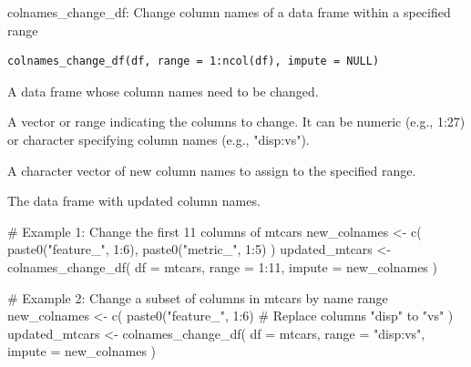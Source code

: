 \documentclass[a4paper]{book}
\begin{document}
%
\begin{Description}
colnames\_change\_df: Change column names of a data frame within a specified range
\end{Description}
%
\begin{Usage}
\begin{verbatim}
colnames_change_df(df, range = 1:ncol(df), impute = NULL)
\end{verbatim}
\end{Usage}
%
\begin{Arguments}
\begin{ldescription}
\item[\code{df}] A data frame whose column names need to be changed.

\item[\code{range}] A vector or range indicating the columns to change. It can be numeric (e.g., 1:27) or character specifying column names (e.g., "disp:vs").

\item[\code{impute}] A character vector of new column names to assign to the specified range.
\end{ldescription}
\end{Arguments}
%
\begin{Value}
The data frame with updated column names.
\end{Value}
%
\begin{Examples}
\begin{ExampleCode}
# Example 1: Change the first 11 columns of mtcars
new_colnames <- c(
  paste0("feature_", 1:6),
  paste0("metric_", 1:5)
)
updated_mtcars <- colnames_change_df(
  df = mtcars,
  range = 1:11,
  impute = new_colnames
)

# Example 2: Change a subset of columns in mtcars by name range
new_colnames <- c(
  paste0("feature_", 1:6)   # Replace columns "disp" to "vs"
)
updated_mtcars <- colnames_change_df(
  df = mtcars,
  range = "disp:vs",
  impute = new_colnames
)

\end{ExampleCode}
\end{Examples}
\end{document}
